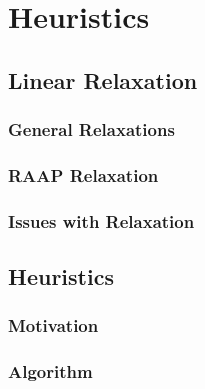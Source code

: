 \chapter{Heuristics}

\section{Linear Relaxation}



\subsection{General Relaxations}

\subsection{RAAP Relaxation}

\subsection{Issues with Relaxation}

\section{Heuristics}

\subsection{Motivation}

\subsection{Algorithm}